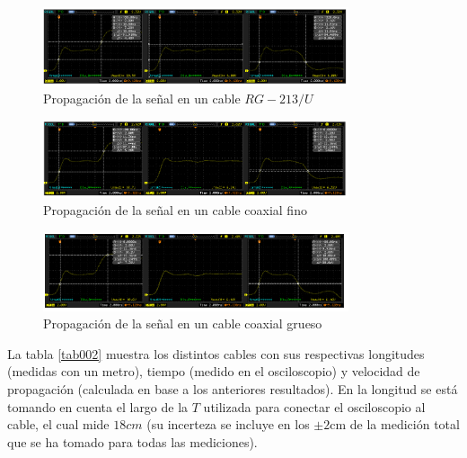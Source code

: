 \documentclass[a4paper,10pt]{article}
\begin{document}
			\begin{figure}[!htb]
				\centering
				\includegraphics[width=9cm]
				{Imagenes/CableF&G.png}
				\caption{Propagación de la señal en un cable $RG-213/U$}
				\label{a}
			\end{figure}
			\begin{figure}[!htb]
				\centering
				\includegraphics[width=9cm]
				{Imagenes/CableCoaxialFino.png}
				\caption{Propagación de la señal en un cable coaxial fino}
				\label{b}
			\end{figure}
			\begin{figure}[!htb]
				\centering
				\includegraphics[width=9cm]
				{Imagenes/CableCoaxialGrueso.png}
				\caption{Propagación de la señal en un cable coaxial grueso}
				\label{c}
			\end{figure}
	
		\indent La tabla \ref{tab002} muestra los distintos cables con sus 
		respectivas longitudes (medidas con un metro), tiempo (medido en el osciloscopio) y velocidad de propagación (calculada en base a los anteriores resultados). En
		la longitud se está tomando en cuenta el largo de la $T$ utilizada para 
		conectar el osciloscopio al cable, el cual mide $18 cm$ (su incerteza se incluye en los $\pm2\text{cm}$ de la medici\'on total que se ha tomado para todas las mediciones). \\
		
\end{document}
